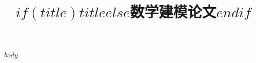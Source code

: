 \documentclass[withoutpreface,bwprint]{cumcmthesis}
\title{$if(title)$$title$$else$数学建模论文$endif$}
\begin{document}
\maketitle

$body$
\end{document}

